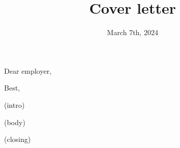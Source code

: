 \documentclass[11pt,a4paper,sans]{moderncv}
\title{Cover letter}
\begin{document}
	\date{March 7th, 2024}
	\opening{Dear employer,}
	\closing{Best,}
	\makelettertitle
	
	(intro)
	
	(body)
	
	(closing)
	
	\makeletterclosing
	
\end{document}
